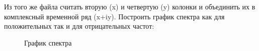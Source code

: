\documentclass[a4paper,oneside,14pt]{extreport}
\begin{document}
Из того же файла считать вторую (x) и четвертую (y) колонки и объединить их в  комплексный временной ряд (x+iy). Построить график спектра как для положительных так и для отрицательных частот:

\begin{figure}[h]
	\caption{График спектра}
	\label{task3_g1}
\end{figure}
\end{document}
